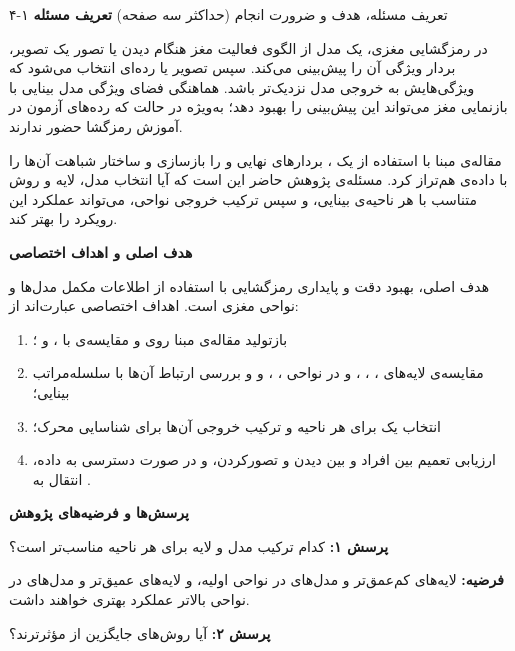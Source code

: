 \documentclass{ut-proposal}
\newcommand{\ProposalSubheading}[1]{\textcolor{UTBlue}{\textbf{#1}}}
\begin{document}
	
	\UTCoverPage{}
	\UTSummaryPage
	
	
	\begin{UTProposalSection}{۴-۱ تعریف مسئله، هدف و ضرورت انجام (حداکثر سه صفحه)}
		\ProposalSubheading{تعریف مسئله}

		در رمزگشایی مغزی، یک مدل از الگوی فعالیت مغز هنگام دیدن یا تصور یک تصویر، بردار ویژگی آن را پیش‌بینی می‌کند. سپس تصویر یا رده‌ای انتخاب می‌شود که ویژگی‌هایش به خروجی مدل نزدیک‌تر باشد. هماهنگی فضای ویژگی مدل بینایی با بازنمایی مغز می‌تواند این پیش‌بینی را بهبود دهد؛ به‌ویژه در حالت  که رده‌های آزمون در آموزش رمزگشا حضور ندارند.

		مقاله‌ی مبنا \lr{[1]} با استفاده از یک ، بردارهای نهایی  و  را بازسازی و ساختار شباهت آن‌ها را با داده‌ی  هم‌تراز کرد. مسئله‌ی پژوهش حاضر این است که آیا انتخاب مدل، لایه و روش  متناسب با هر ناحیه‌ی بینایی، و سپس ترکیب خروجی نواحی، می‌تواند عملکرد این رویکرد را بهتر کند.

		\ProposalSubheading{هدف اصلی و اهداف اختصاصی}

		هدف اصلی، بهبود دقت و پایداری رمزگشایی  با استفاده از اطلاعات مکمل مدل‌ها و نواحی مغزی است. اهداف اختصاصی عبارت‌اند از:
		\begin{enumerate}[label=\arabic*.]
			\item بازتولید مقاله‌ی مبنا روی  و مقایسه‌ی  با ،  و ؛
			\item مقایسه‌ی لایه‌های ، ، ،  و  در نواحی ، ،  و  و بررسی ارتباط آن‌ها با سلسله‌مراتب بینایی؛
			\item انتخاب یک  برای هر ناحیه و ترکیب خروجی آن‌ها برای شناسایی محرک؛
			\item ارزیابی تعمیم بین افراد و بین دیدن و تصورکردن، و در صورت دسترسی به داده، انتقال به .
		\end{enumerate}

		\ProposalSubheading{پرسش‌ها و فرضیه‌های پژوهش}

		\textbf{پرسش ۱:} کدام ترکیب مدل و لایه برای هر ناحیه مناسب‌تر است؟ 
		
		\textbf{فرضیه:} لایه‌های کم‌عمق‌تر و مدل‌های  در نواحی اولیه، و لایه‌های عمیق‌تر و مدل‌های  در نواحی بالاتر عملکرد بهتری خواهند داشت.

		\textbf{پرسش ۲:} آیا روش‌های جایگزین  از  مؤثرترند؟ 
		

\end{UTProposalSection}
\end{document}
